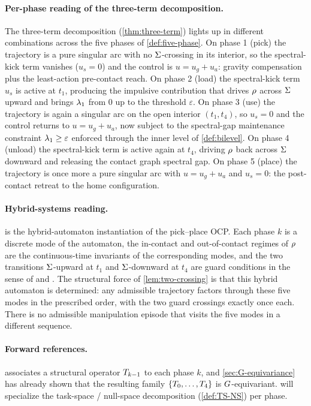 \paragraph{Per-phase reading of the three-term decomposition.}
The three-term decomposition (\cref{thm:three-term}) lights up
in different combinations across the five phases of
\cref{def:five-phase}. On phase 1 (pick) the trajectory is a
pure singular arc with no $\Sigma$-crossing in its interior, so
the spectral-kick term vanishes ($u_{s} = 0$) and the control is
$u = u_{g} + u_{a}$: gravity compensation plus the least-action
pre-contact reach. On phase 2 (load) the spectral-kick term
$u_{s}$ is active at $t_{1}$, producing the impulsive
contribution that drives $\rho$ across $\Sigma$ upward and
brings $\lambda_{1}$ from $0$ up to the threshold $\varepsilon$. On
phase 3 (use) the trajectory is again a singular arc on the open
interior $(t_{1}, t_{4})$, so $u_{s} = 0$ and the control returns
to $u = u_{g} + u_{a}$, now subject to the spectral-gap
maintenance constraint $\lambda_{1} \ge \varepsilon$ enforced
through the inner level of \cref{def:bilevel}. On phase 4
(unload) the spectral-kick term is active again at $t_{4}$,
driving $\rho$ back across $\Sigma$ downward and releasing
the contact graph spectral gap. On phase 5 (place) the
trajectory is once more a pure singular arc with $u = u_{g} +
u_{a}$ and $u_{s} = 0$: the post-contact retreat to the home
configuration.

\paragraph{Hybrid-systems reading.}
 is the hybrid-automaton instantiation of
the pick--place OCP. Each phase $k$ is a discrete mode of the
automaton, the in-contact and out-of-contact regimes of $\rho$
are the continuous-time invariants of the corresponding modes,
and the two transitions $\Sigma$-upward at $t_{1}$ and
$\Sigma$-downward at $t_{4}$ are guard conditions in the sense
of \citet{Lygeros2003} and \citet{GoebelSanfeliceTeel2012}. The
structural force of \cref{lem:two-crossing} is that this hybrid
automaton is determined: any admissible trajectory factors
through these five modes in the prescribed order, with the two
guard crossings exactly once each. There is no admissible
manipulation episode that visits the five modes in a different
sequence.

\paragraph{Forward references.}
 associates a structural operator
$T_{k-1}$ to each phase $k$, and \cref{sec:G-equivariance}
has already shown that the resulting family
$\{T_{0}, \ldots, T_{4}\}$ is $G$-equivariant.
 will specialize the task-space /
null-space decomposition (\cref{def:TS-NS}) per phase.

